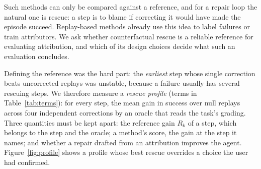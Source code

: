 \documentclass[11pt]{article}
\begin{document}
Such methods can only be compared against a reference, and for a repair loop the natural one is rescue: a step is to blame if correcting it would have made the episode succeed. Replay-based methods already use this idea to label failures or train attributors. We ask whether counterfactual rescue is a reliable reference for evaluating attribution, and which of its design choices decide what such an evaluation concludes.

Defining the reference was the hard part: the \emph{earliest} step whose single correction beats uncorrected replays was unstable, because a failure usually has several rescuing steps. We therefore measure a \emph{rescue profile} (terms in Table~\ref{tab:terms}): for every step, the mean gain in success over null replays across four independent corrections by an oracle that reads the task's grading. Three quantities must be kept apart: the reference gain $R_k$ of a step, which belongs to the step and the oracle; a method's score, the gain at the step it names; and whether a repair drafted from an attribution improves the agent. Figure~\ref{fig:profile} shows a profile whose best rescue overrides a choice the user had confirmed.
\end{document}
